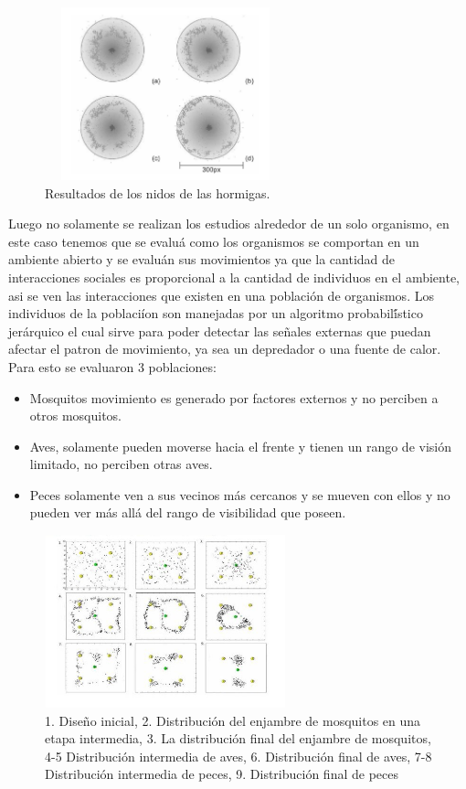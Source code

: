 \documentclass[conference]{IEEEtran}
\begin{document}
\begin{figure}[ht]
  \includegraphics[width=7cm,height=5cm]{img/ant_based_construction.PNG}
  \caption{Resultados de los nidos de las hormigas. \cite{LP01}  }
  \label{fig:ant_based_construction}
\end{figure}

Luego no solamente se realizan los estudios alrededor de un solo organismo, en este caso tenemos que se evalu\'a como los organismos se comportan en un ambiente abierto y se evalu\'an sus movimientos ya que la cantidad de interacciones sociales es proporcional a la cantidad de individuos en el ambiente, asi se ven las interacciones que existen en una poblaci\'on de organismos. \cite{ASTK01, PMLC01}
Los individuos de la poblaci\'ion son manejadas por un algoritmo probabil\'ístico jer\'arquico el cual sirve para poder detectar las se\~nales externas que puedan afectar el patron de movimiento, ya sea un depredador o una fuente de calor. 
Para esto se evaluaron 3 poblaciones:
\begin{itemize}
\item Mosquitos movimiento es generado por factores externos y no perciben a otros mosquitos.
\item Aves, solamente pueden moverse hacia el frente y tienen un rango de visi\'on limitado, no perciben otras aves.
\item Peces solamente ven a sus vecinos m\'as cercanos y se mueven con ellos y no pueden ver m\'as all\'a del rango de visibilidad que poseen.
\end{itemize}

\begin{figure}[ht]
  \includegraphics[width=7cm,height=5cm]{img/mosquitos_sin_nota.JPG}
  \caption{ 1. Dise\~no inicial, 2. Distribuci\'on del enjambre de mosquitos en una etapa intermedia, 3. La distribuci\'on final del enjambre de mosquitos, 4-5 Distribuci\'on intermedia de aves, 6. Distribuci\'on final de aves, 7-8 Distribuci\'on intermedia de peces, 9. Distribuci\'on final de peces \cite{TMRT01} }
  \label{fig:mosquitos}
\end{figure}
\end{document}
